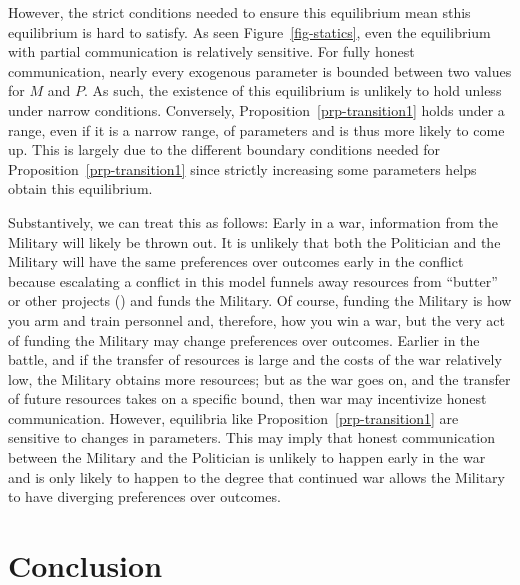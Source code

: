 \documentclass[
  12pt,
]{article}
\theoremstyle{plain}
\theoremstyle{plain}
\theoremstyle{remark}
\begin{document}
However, the strict conditions needed to ensure this equilibrium mean
sthis equilibrium is hard to satisfy. As seen Figure~\ref{fig-statics},
even the equilibrium with partial communication is relatively sensitive.
For fully honest communication, nearly every exogenous parameter is
bounded between two values for \(M\) and \(P\). As such, the existence
of this equilibrium is unlikely to hold unless under narrow conditions.
Conversely, Proposition~\ref{prp-transition1} holds under a range, even
if it is a narrow range, of parameters and is thus more likely to come
up. This is largely due to the different boundary conditions needed for
Proposition~\ref{prp-transition1} since strictly increasing some
parameters helps obtain this equilibrium.

Substantively, we can treat this as follows: Early in a war, information
from the Military will likely be thrown out. It is unlikely that both
the Politician and the Military will have the same preferences over
outcomes early in the conflict because escalating a conflict in this
model funnels away resources from ``butter'' or other projects
() and funds the Military.
Of course, funding the Military is how you arm and train personnel and,
therefore, how you win a war, but the very act of funding the Military
may change preferences over outcomes. Earlier in the battle, and if the
transfer of resources is large and the costs of the war relatively low,
the Military obtains more resources; but as the war goes on, and the
transfer of future resources takes on a specific bound, then war may
incentivize honest communication. However, equilibria like
Proposition~\ref{prp-transition1} are sensitive to changes in
parameters. This may imply that honest communication between the
Military and the Politician is unlikely to happen early in the war and
is only likely to happen to the degree that continued war allows the
Military to have diverging preferences over outcomes.

\section{Conclusion}\label{conclusion}
\end{document}
